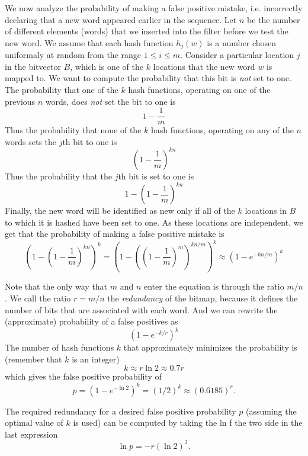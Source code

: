   We now analyze the probability of making a false positive mistake,
  i.e. incorrectly declaring that a new word appeared earlier in the
  sequence. Let $n$ be the number of different elements (words) that
  we inserted into the filter before we test the new word. We assume
  that each hash function $h_j(w)$ is a number chosen uniformaly at
  random from the range $1 \leq i \leq m$. Consider a particular
  location $j$ in the bitvector $B$, which is one of the $k$ locations
  that the new word $w$ is mapped to. We want to compute the
  probability that this bit is {\em not} set to one. The probability
  that one of the $k$ hash functions, operating on one of the previous
  $n$ words, does {\em not} set the bit to one is
  \[
  1-\frac{1}{m}
  \]
  Thus the probability that none of the $k$ hash functions, operating
  on any of the $n$ words sets the $j$th bit to one is
  \[
  \left(  1-\frac{1}{m} \right)^{kn}
  \]
  Thus the probability that the $j$th bit is set to one is 
  \[
  1-\left(  1-\frac{1}{m} \right)^{kn}
  \]
  Finally, the new word will be identified as new only if all of the
  $k$ locations in $B$ to which it is hashed have been set to one. As
  these locations are independent, we get that the probability of
  making a false positive mistake is 
  \[
  \left(  1-\left(  1-\frac{1}{m} \right)^{kn} \right)^k =
  \left(  1-\left( \left(  1-\frac{1}{m} \right)^m \right)^{kn/m}\right)^k \approx
  \left(  1-e^{-kn/m}\right)^k
  \]

Note that the only way that $m$ and $n$ enter the equation is through
the ratio $m/n$. We call the ratio $r=m/n$ the {\em redundancy} of the
bitmap, because it defines the number of bits that are associated with
each word. And we can rewrite the (approximate) probability of a false 
positives as
\[
\left(  1-e^{-k/r}\right)^k
\]
The number of hash functions $k$ that approximately 
minimizes the probability is (remember that $k$ is an integer)
\begin{equation} \label{eqn:optimal-k}
k \approx r \ln 2 \approx 0.7 r
\end{equation}
which gives the false positive probability of
\[p=\left(  1-e^{-\ln 2} \right)^k = (1/2)^{k} \approx (0.6185)^{r}.\] 

The required redundancy for a desired false positive probability $p$
(assuming the optimal value of $k$ is used) can be computed by
taking the ln f the two side in the last expression
\begin{equation} \label{eqn:optimal-p}
\ln p = -r (\ln 2)^2.
\end{equation}

